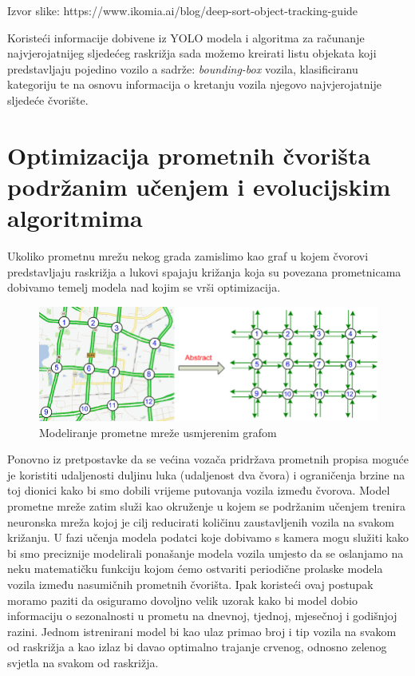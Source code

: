 \documentclass[seminarski, times, utf8]{fer}
\begin{document}
\begin{flushleft}
  \small
  Izvor slike: https://www.ikomia.ai/blog/deep-sort-object-tracking-guide
\end{flushleft}
Koristeći informacije dobivene iz YOLO modela i algoritma za računanje najvjerojatnijeg sljedećeg raskrižja sada možemo kreirati listu objekata koji predstavljaju pojedino vozilo a sadrže: \textit{bounding-box}
vozila, klasificiranu kategoriju te na osnovu informacija o kretanju vozila njegovo najvjerojatnije sljedeće čvorište.

\section{Optimizacija prometnih čvorišta podržanim učenjem i evolucijskim algoritmima}
Ukoliko prometnu mrežu nekog grada zamislimo kao graf u kojem čvorovi predstavljaju raskrižja a lukovi spajaju križanja koja su povezana prometnicama dobivamo temelj modela nad kojim se vrši optimizacija.
\begin{figure}[H]
   \centering
   \includegraphics[width=0.7\linewidth]{slike/img4.png}
   \caption{Modeliranje prometne mreže usmjerenim grafom}
   \label{fig:yolo}
\end{figure} Ponovno iz pretpostavke da se većina vozača pridržava prometnih propisa moguće je koristiti udaljenosti duljinu luka (udaljenost dva čvora) i ograničenja brzine na toj dionici kako bi smo dobili vrijeme putovanja vozila između čvorova. Model prometne mreže zatim služi kao okruženje u kojem se podržanim učenjem trenira neuronska mreža kojoj je cilj reducirati količinu zaustavljenih vozila na svakom križanju. U fazi učenja modela podatci koje dobivamo s kamera mogu služiti kako bi smo preciznije modelirali ponašanje modela vozila umjesto da se oslanjamo na neku matematičku funkciju kojom ćemo ostvariti periodične prolaske modela vozila između nasumičnih prometnih čvorišta. Ipak koristeći ovaj postupak moramo paziti da osiguramo dovoljno velik uzorak kako bi model dobio informaciju o sezonalnosti u prometu na dnevnoj, tjednoj, mjesečnoj i godišnjoj razini. Jednom istrenirani model bi kao ulaz primao broj i tip vozila na svakom od raskrižja a kao izlaz bi davao optimalno trajanje crvenog, odnosno zelenog svjetla na svakom od raskrižja. 
\end{document}
